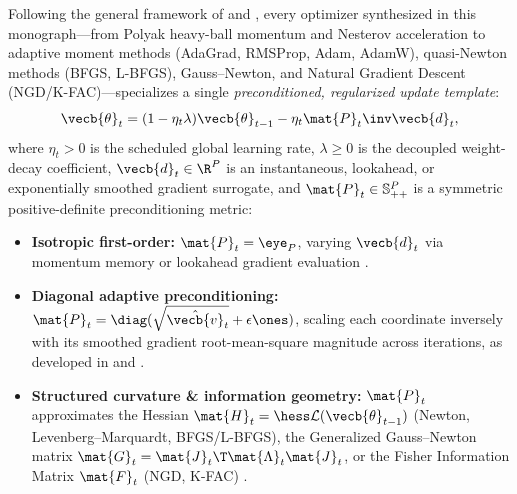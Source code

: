 \documentclass[../../../../master.tex]{subfiles}
\begin{document}
Following the general framework of  and , every optimizer synthesized in this monograph---from Polyak heavy-ball momentum and Nesterov acceleration to adaptive moment methods (AdaGrad, RMSProp, Adam, AdamW), quasi-Newton methods (BFGS, L-BFGS), Gauss--Newton, and Natural Gradient Descent (NGD/K-FAC)---specializes a single \emph{preconditioned, regularized update template}:
\begin{equation}
\label{eq:optalg:unified_template}
  \vecb{\theta}_{t} = (1 - \eta_t \lambda)\vecb{\theta}_{t-1} - \eta_t \mat{P}_t\inv \vecb{d}_t,
\end{equation}
where $\eta_t > 0$ is the scheduled global learning rate, $\lambda \ge 0$ is the decoupled weight-decay coefficient, $\vecb{d}_t \in \R^P$ is an instantaneous, lookahead, or exponentially smoothed gradient surrogate, and $\mat{P}_t \in \mathbb{S}_{++}^P$ is a symmetric positive-definite preconditioning metric:
\begin{itemize}
  \item \textbf{Isotropic first-order:} $\mat{P}_t = \eye_P$, varying $\vecb{d}_t$ via momentum memory or lookahead gradient evaluation  .
  \item \textbf{Diagonal adaptive preconditioning:} $\mat{P}_t = \diag(\sqrt{\hat{\vecb{v}}_t} + \epsilon\ones)$, scaling each coordinate inversely with its smoothed gradient root-mean-square magnitude across iterations, as developed in  and .
  \item \textbf{Structured curvature \& information geometry:} $\mat{P}_t$ approximates the Hessian $\mat{H}_t = \hess\mathcal{L}(\vecb{\theta}_{t-1})$ (Newton, Levenberg--Marquardt, BFGS/L-BFGS), the Generalized Gauss--Newton matrix $\mat{G}_t = \mat{J}_t\T \mat{\Lambda}_t \mat{J}_t$, or the Fisher Information Matrix $\mat{F}_t$ (NGD, K-FAC) .
\end{itemize}
\end{document}
